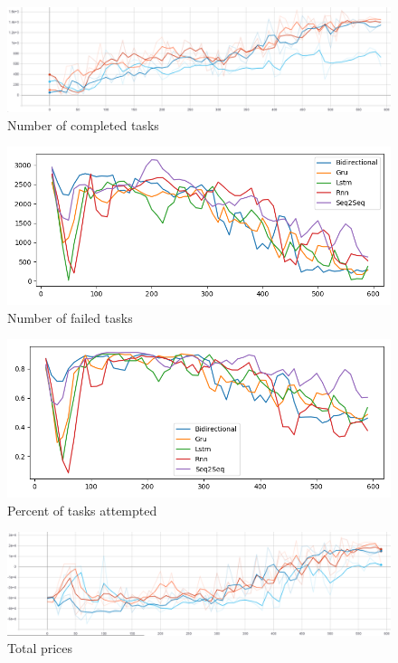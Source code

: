 \begin{figure}[H]
    \centering
    \includegraphics[width=\linewidth]{figures/5_evaluation_figs/net_arch_training_fig/num_completed_tasks.PNG}
    \caption{Number of completed tasks}
    \label{fig:net_arch_num_completed_tasks}
\end{figure}

\begin{figure}[H]
    \centering
    \includegraphics[width=\linewidth]{figures/5_evaluation_figs/net_arch_training_fig/num_failed_tasks.png}
    \caption{Number of failed tasks}
    \label{fig:net_arch_num_failed_tasks}
\end{figure}

\begin{figure}[H]
    \centering
    \includegraphics[width=\linewidth]{figures/5_evaluation_figs/net_arch_training_fig/percent_tasks.png}
    \caption{Percent of tasks attempted}
    \label{fig:net_arch_percent_tasks}
\end{figure}

\begin{figure}[H]
    \centering
    \includegraphics[width=\linewidth]{figures/5_evaluation_figs/net_arch_training_fig/total_prices.png}
    \caption{Total prices}
    \label{fig:net_arch_total_prices}
\end{figure}


